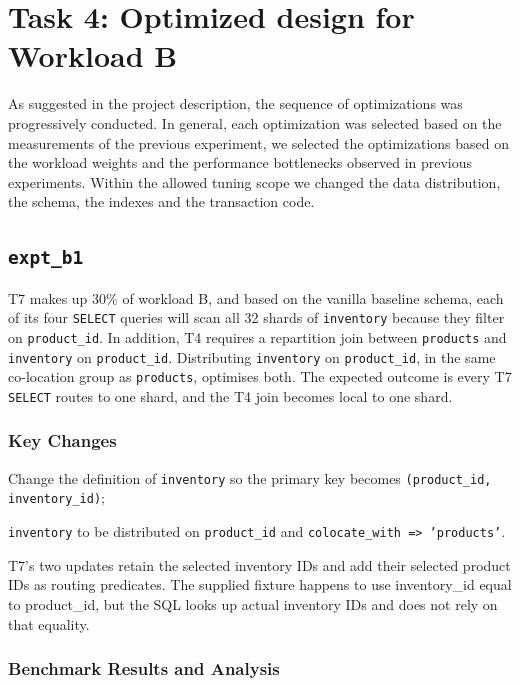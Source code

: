\section{Task 4: Optimized design for Workload B}
As suggested in the project description, the sequence of optimizations was progressively conducted. In general, each optimization was selected based on the measurements of the previous experiment, we selected the optimizations based on the workload weights and the performance bottlenecks observed in previous experiments. Within the allowed tuning scope we changed the data distribution, the schema, the indexes and the transaction code.\par
{}\subsection{\texttt{expt\_\allowbreak{}b1}}
T7 makes up 30\% of workload B, and based on the vanilla baseline schema, each of its four \texttt{SELECT} queries will scan all 32 shards of \texttt{inventory} because they filter on \texttt{product\_\allowbreak{}id}. In addition, T4 requires a repartition join between \texttt{products} and \texttt{inventory} on \texttt{product\_\allowbreak{}id}. Distributing \texttt{inventory} on \texttt{product\_\allowbreak{}id}, in the same co-location group as \texttt{products}, optimises both. The expected outcome is every T7 \texttt{SELECT} routes to one shard, and the T4 join becomes local to one shard.\par
{}\subsubsection*{Key Changes}
Change the definition of \texttt{inventory}  so the primary key becomes \texttt{(product\_\allowbreak{}id, inventory\_\allowbreak{}id)};\par
\texttt{inventory} to be distributed on \texttt{product\_\allowbreak{}id} and \texttt{colocate\_\allowbreak{}with => 'products'}.\par
T7's two updates retain the selected inventory IDs and add their selected product IDs as routing predicates. The supplied fixture happens to use inventory\_id equal to product\_id, but the SQL looks up actual inventory IDs and does not rely on that equality.\par
{}\subsubsection*{Benchmark Results and Analysis}
